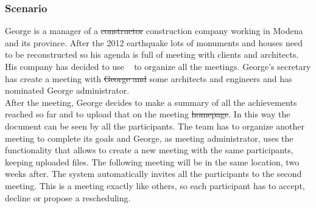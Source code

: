 \subsubsection{Scenario \thecountScenarios }
George is a manager of a \st{constructor} construction company working in Modena and its province. After the 2012 earthquake lots of monuments and houses need to be reconstructed so his agenda is full of meeting with clients and architects. His company has decided to use \projectname~ to organize all the meetings. George's secretary has create a meeting with \st{George and} some architects and engineers and has nominated George administrator. \\
After the meeting, George decides to make a summary of all the achievements reached so far and to upload that on the meeting \st{homepage}. In this way the document can be seen by all the participants. The team has to organize another meeting to complete its goals and George, as meeting administrator, uses the \projectname~ functionality that allows to create a new meeting with the same participants, keeping uploaded files. The following meeting will be in the same location, two weeks after. The system automatically invites all the participants to the second meeting. This is a meeting exactly like others, so each participant has to accept, decline or propose a rescheduling.\\

